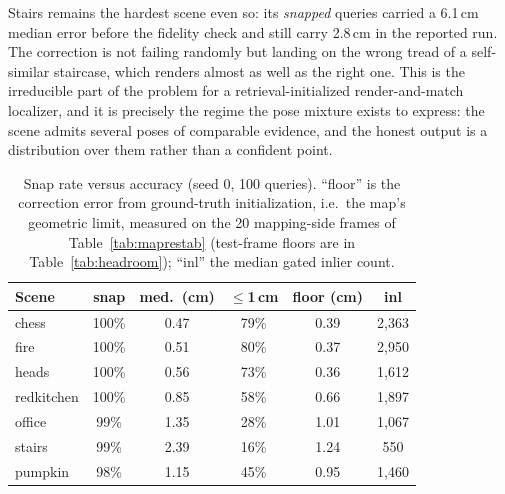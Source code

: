 \documentclass[journal]{IEEEtran}
\begin{document}
Stairs remains the hardest scene even so: its \emph{snapped} queries carried a 6.1\,cm median error before the fidelity check and still carry 2.8\,cm in the reported run. The correction is not failing randomly but
landing on the wrong tread of a self-similar staircase, which renders
almost as well as the right one. This is the irreducible part of the
problem for a retrieval-initialized render-and-match localizer, and it is
precisely the regime the pose mixture exists to express: the scene admits
several poses of comparable evidence, and the honest output is a
distribution over them rather than a confident point.

\begin{table}[t]
\caption{Snap rate versus accuracy (seed 0, 100 queries). ``floor'' is the
correction error from ground-truth initialization, i.e.\ the map's geometric limit, measured on the 20 mapping-side frames of Table~\ref{tab:maprestab} (test-frame floors are in Table~\ref{tab:headroom}); ``inl'' the median gated inlier count.}
\label{tab:snaprate}
\centering\footnotesize
\setlength{\tabcolsep}{4pt}
\begin{tabular}{@{}lccccc@{}}
\toprule
Scene & snap & med.\ (cm) & $\le$1\,cm & floor (cm) & inl \\
\midrule
chess      & 100\% & 0.47 & 79\% & 0.39 & 2{,}363 \\
fire       & 100\% & 0.51 & 80\% & 0.37 & 2{,}950 \\
heads      & 100\% & 0.56 & 73\% & 0.36 & 1{,}612 \\
redkitchen & 100\% & 0.85 & 58\% & 0.66 & 1{,}897 \\
office     & 99\% & 1.35 & 28\% & 1.01 & 1{,}067 \\
stairs     & 99\% & 2.39 & 16\% & 1.24 & 550 \\
pumpkin    & 98\% & 1.15 & 45\% & 0.95 & 1{,}460 \\
\bottomrule
\end{tabular}
\end{table}
\end{document}

